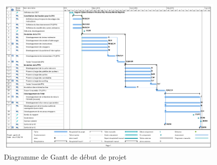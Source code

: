 \begin{figure}[h]
  \centering
   \includegraphics[scale=0.45]{GanttV1.png}
   \caption{\label{etiquette} Diagramme de Gantt de début de projet}
\end{figure}
